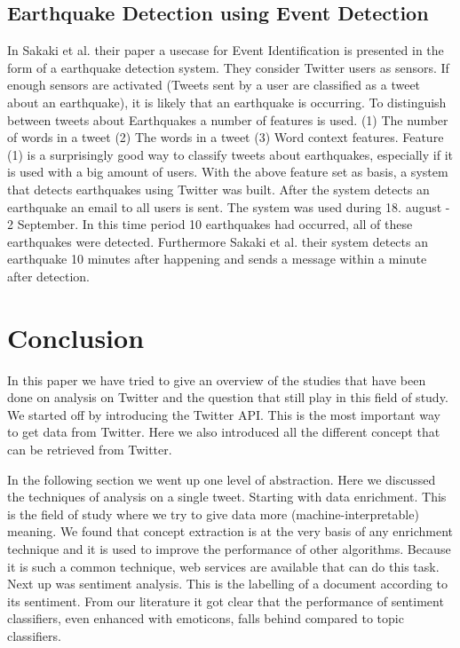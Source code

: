 \documentclass{article}
\begin{document}
\subsection*{Earthquake Detection using Event Detection}

In Sakaki et al. their paper a usecase for Event Identification is presented in the form of a earthquake detection system. \cite{earthq} They consider 
Twitter users as sensors. If enough sensors are activated (Tweets sent by a user are classified as a tweet about an earthquake), it is likely that an 
earthquake is occurring. 
To distinguish between tweets about Earthquakes a number of features is used. (1) The number of words in a tweet (2) The words in a tweet (3) Word context 
features. Feature (1) is a surprisingly good way to classify tweets about earthquakes, especially if it is used with a big amount of users. With the above 
feature set as basis, a system that detects earthquakes using Twitter was built. After the system detects an earthquake an email to all users is sent. 
The system was used during 18. august - 2 September. In this time period 10 earthquakes had occurred, all of these earthquakes were detected. Furthermore 
Sakaki et al. their system detects an earthquake 10 minutes after happening and sends a message within a minute after detection. 
\cite{earthq}



\section{Conclusion}
In this paper we have tried to give an overview of the studies that have been done on analysis on Twitter and the question that still play in this field of study. We started off by introducing the Twitter API. This is the most important way to get data from Twitter. Here we also introduced all the different concept that can be retrieved from Twitter. 

In the following section we went up one level of abstraction. Here we discussed the techniques of analysis on a single tweet. Starting with data enrichment. This is the field of study where we try to give data more (machine-interpretable) meaning. We found that concept extraction is at the very basis of any enrichment technique and it is used to improve the performance of other algorithms. Because it is such a common technique, web services are available that can do this task. Next up was sentiment analysis. This is the labelling of a document according to its sentiment. From our literature it got clear that the performance of sentiment classifiers, even enhanced with emoticons, falls behind compared to topic classifiers. 
\end{document}
